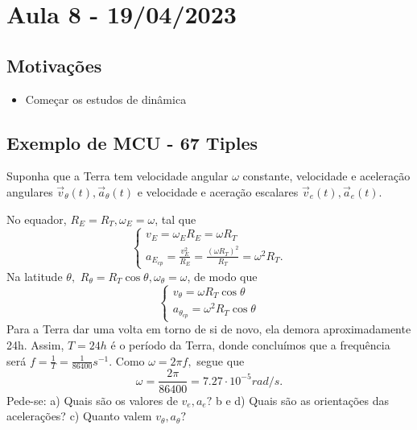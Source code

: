 \documentclass{article}
\begin{document}
\section{Aula 8 - 19/04/2023}
\subsection{Motiva\c c\~oes}
\begin{itemize}
  \item Come\c car os estudos de din\^amica
\end{itemize}

\subsection{Exemplo de MCU - 67 Tiples}
Suponha que a Terra tem velocidade angular $\omega$ constante, velocidade e acelera\c c\~ao angulares $\vec{v}_{\theta}(t), \vec{a}_{\theta}(t)$
e velocidade e acera\c c\~ao escalares $\vec{v}_{e}(t), \vec{a}_{e}(t)$.
\begin{center}
\end{center}

 No equador, $R_{E}=R_{T}, \omega_{E}=\omega$, tal que 
   $$
      \left\{\begin{array}{ll}
         v_{E}=\omega_{E}R_{E} = \omega R_{T}\\
         a_{E_{cp}} = \frac{v_{E}^{2}}{R_{E}} = \frac{(\omega R_{T})^{2}}{R_{T}} = \omega^{2}R_{T}.
       \end{array}\right.
   $$
   Na latitude $\theta,$ $R_{\theta} = R_{T}\cos{\theta}, \omega_{\theta} = \omega$, de modo que 
     $$
        \left\{\begin{array}{ll}
           v_{\theta} = \omega R_{T}\cos{\theta}\\
           a_{\theta_{cp}} = \omega^{2}R_{T}\cos{\theta}
         \end{array}\right.
     $$
  Para a Terra dar uma volta em torno de si de novo, ela demora aproximadamente 24h. Assim, $T = 24h$ \'e o per\'iodo da Terra,
donde conclu\'imos que a frequ\^encia ser\'a $f = \frac{1}{T} = \frac{1}{86400}s^{-1}.$ Como $\omega = 2\pi f,$ segue que 
  $$
    \omega = \frac{2\pi}{86400} = 7.27 \cdot 10^{-5}rad/s.
  $$
  Pede-se: a) Quais s\~ao os valores de $v_{e}, a_{e}?$ b e d) Quais s\~ao as orienta\c c\~oes das acelera\c c\~oes? c) Quanto valem $v_{\theta}, a_{\theta}?$
\end{document}
